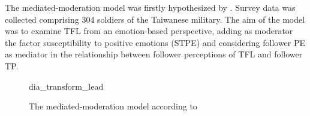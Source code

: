 \documentclass[	
	12pt, %
	a4paper, %
  abstracton
]{scrartcl}\usepackage[]{graphicx}\usepackage[]{color}
\begin{document}
The mediated-moderation model was firstly hypothesized by . Survey data was collected comprising 304 soldiers of the Taiwanese military. The aim of the model was to examine TFL from an emotion-based perspective, adding as moderator the factor susceptibility to positive emotions (STPE) and considering  follower PE as mediator in the relationship between follower perceptions of TFL and follower TP. 


\begin{figure}[h]
\centering
\def\svgwidth{\columnwidth}
{dia_transform_lead}
\caption{The mediated-moderation model according to \protect{}}
\label{model}
\end{figure}



\end{document}
